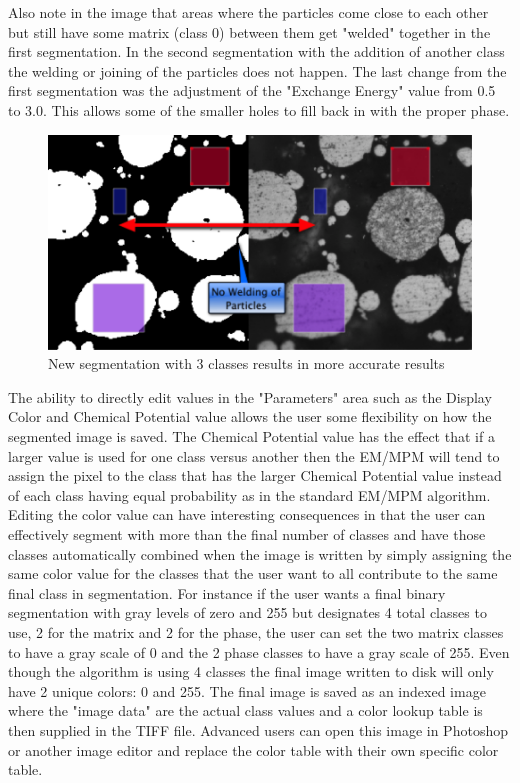 \documentclass[12pt,oneside]{book}
\begin{document}
Also note in the image that areas where the particles come close to each other but still have some matrix (class 0) between them get "welded" together in the first segmentation. In the second segmentation with the addition of another class the welding or joining of the particles does not happen. The last change from the first segmentation was the adjustment of the "Exchange Energy" value from 0.5 to 3.0. This allows some of the smaller holes to fill back in with the proper phase. 
 

\begin{figure}[htbp]
\begin{center}
\includegraphics[width=6.25in]{images/Untitled12.png}
\caption{New segmentation with 3 classes results in more accurate results}
\label{image12}
\end{center}
\end{figure}

The ability to directly edit values in the "Parameters" area such as the Display Color and Chemical Potential value allows the user some flexibility on how the segmented image is saved. The Chemical Potential value has the effect that if a larger value is used for one class versus another then the EM/MPM will tend to assign the pixel to the class that has the larger Chemical Potential value instead of each class having equal probability as in the standard EM/MPM algorithm. Editing the color value can have interesting consequences in that the user can effectively segment with more than the final number of classes and have those classes automatically combined when the image is written by simply assigning the same color value for the classes that the user want to all contribute to the same final class in segmentation. For instance if the user wants a final binary segmentation with gray levels of zero and 255 but designates 4 total classes to use, 2 for the matrix and 2 for the phase, the user can set the two matrix classes to have a gray scale of 0 and the 2 phase classes to have a gray scale of 255. Even though the algorithm is using 4 classes the final image written to disk will only have 2 unique colors: 0 and 255. The final image is saved as an indexed image where the "image data" are the actual class values and a color lookup table is then supplied in the TIFF file. Advanced users can open this image in Photoshop or another image editor and replace the color table with their own specific color table.
\end{document}
